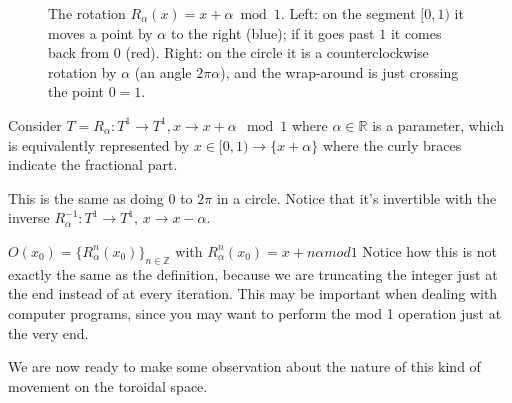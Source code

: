 \begin{figure}[ht]
    \caption{The rotation $R_\alpha(x)=x+\alpha \bmod 1$. Left: on the segment $[0,1)$ it moves a point
    by $\alpha$ to the right (blue); if it goes past $1$ it comes back from $0$ (red).
    Right: on the circle it is a counterclockwise rotation by $\alpha$ (an angle $2\pi\alpha$),
    and the wrap-around is just crossing the point $0=1$.}
    \label{fig:rotation_torus}
\end{figure}

Consider $T=R_{\alpha}:T^1\rightarrow T^1, x \rightarrow x+\alpha \mod 1$ where $\alpha\in\mathbb{R}$ is a parameter, which is equivalently represented by $x\in[0, 1)\rightarrow \{x+\alpha\}$ where the curly braces indicate the fractional part.

This is the same as doing 0 to $2\pi$ in a circle. Notice that it's invertible with the inverse $R^{-1}_{\alpha}:T^1\rightarrow T^1,\,x\rightarrow x-\alpha$.

\begin{observation}
    $O(x_0)=\{R_{\alpha}^n(x_0)\}_{n\in\mathbb{Z}}$ with $R^n_{\alpha}(x_0)=x+n\alpha mod 1$ 
    Notice how this is not exactly the same as the definition, because we are truncating the integer just at the end instead of at every iteration. This may be important when dealing with computer programs, since you may want to perform the mod 1 operation just at the very end.
\end{observation}

We are now ready to make some observation about the nature of this kind of movement on the toroidal space.

